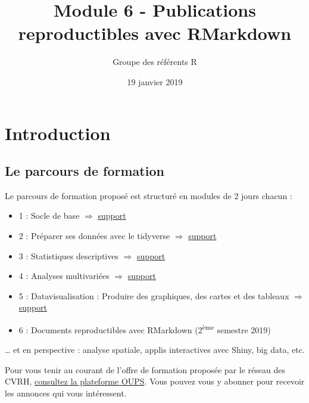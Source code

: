 \documentclass[]{article}
\title{Module 6 - Publications reproductibles avec RMarkdown}
\author{Groupe des référents R}
\date{19 janvier 2019}
\providecommand{\tightlist}{%
  \setlength{\itemsep}{0pt}\setlength{\parskip}{0pt}}
\begin{document}
\maketitle

\section{Introduction}\label{introduction}

\subsection{Le parcours de formation}\label{le-parcours-de-formation}

Le parcours de formation proposé est structuré en modules de 2 jours
chacun :

\begin{itemize}
\tightlist
\item
  1 : Socle de base \(\Rightarrow\)
  \href{https://rawgit.com/MTES-MCT/parcours-r/master/Supports_formations/m1_socle/_book/index.html}{support}
\item
  2 : Préparer ses données avec le tidyverse \(\Rightarrow\)
  \href{https://rawgit.com/MTES-MCT/parcours-r/master/Supports_formations/m2_preparation_donnees/_book/index.html}{support}
\item
  3 : Statistiques descriptives \(\Rightarrow\)
  \href{https://rawgit.com/MTES-MCT/parcours-r/master/Supports_formations/m3_stats_desc/_book/index.html}{support}
\item
  4 : Analyses multivariées \(\Rightarrow\)
  \href{https://rawgit.com/MTES-MCT/parcours-r/master/Supports_formations/m4_analyse_donnees/_book/index.html}{support}
\item
  5 : Datavisualisation : Produire des graphiques, des cartes et des
  tableaux \(\Rightarrow\)
  \href{https://rawgit.com/MTES-MCT/parcours-r/master/Supports_formations/m5_valorisation_des_donnees/_book/index.html}{support}
\item
  6 : Documents reproductibles avec RMarkdown (2\textsuperscript{ème}
  semestre 2019)
\end{itemize}

\ldots{} et en perspective : analyse spatiale, applis interactives avec
Shiny, big data, etc.

Pour vous tenir au courant de l'offre de formation proposée par le
réseau des CVRH, \href{http://oups-cmvrh.e2.rie.gouv.fr/}{consultez la
plateforme OUPS}. Vous pouvez vous y abonner pour recevoir les annonces
qui vous intéressent.
\end{document}
